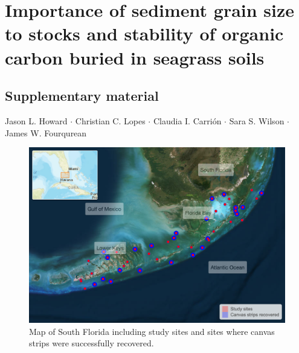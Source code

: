 
\author{Jason L. Howard         \and
        Christian C. Lopes       \and
        Claudia I. Carri\'{o}n    \and
        Sara S. Wilson         \and
        James W. Fourqurean %
}









\section*{Importance of sediment grain size to stocks and stability of organic carbon buried in seagrass soils}


\subsection*{Supplementary material \bigskip}
Jason L. Howard $\cdot$ Christian C. Lopes $\cdot$ Claudia I. Carri\'{o}n $\cdot$ Sara S. Wilson $\cdot$ James W. Fourqurean


\bigskip
\bigskip

\begin{figure}[h]
  \centering
   \includegraphics[width=.99\textwidth,clip, trim={0.1mm 0.1mm 0.1mm 0.1mm}]{OEM1_site_map.png}
\caption[Regional map including sites]{Map of South Florida including study sites and sites where canvas strips were successfully recovered.}
  \label{Online Resource:2F0}
\end{figure}


